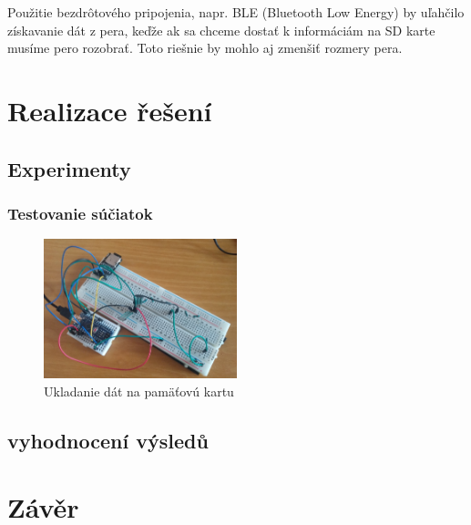 Použitie bezdrôtového pripojenia, napr. BLE (Bluetooth Low Energy) by uľahčilo získavanie dát z pera, keďže ak sa chceme dostať k informáciám na SD karte musíme pero rozobrať. Toto riešnie by mohlo aj zmenšiť rozmery pera.

\chapter{Realizace řešení}

\section{Experimenty}

\subsection*{Testovanie súčiatok}

\begin{figure}[hbt]
	\centering
	\includegraphics[width=0.5\textwidth]{obrazky-figures/FSRtestSD.png}
	\caption{Ukladanie dát na pamäťovú kartu}
	\label{Experiment1}
\end{figure}

\section{vyhodnocení výsledů}

\chapter{Závěr}

\label{zaver}

